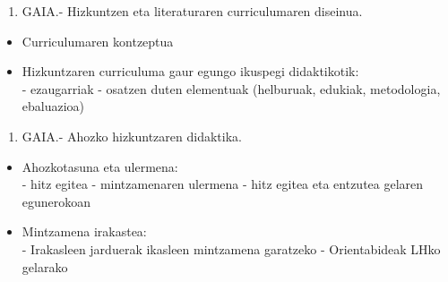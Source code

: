 \documentclass[
]{book}
\providecommand{\tightlist}{%
  \setlength{\itemsep}{0pt}\setlength{\parskip}{0pt}}
\begin{document}
\begin{enumerate}
\def\labelenumi{\arabic{enumi}.}
\tightlist
\item
  GAIA.- Hizkuntzen eta literaturaren curriculumaren diseinua.\\
\end{enumerate}

\begin{itemize}
\tightlist
\item
  Curriculumaren kontzeptua\\
\item
  Hizkuntzaren curriculuma gaur egungo ikuspegi didaktikotik:\\
  - ezaugarriak
  - osatzen duten elementuak (helburuak, edukiak, metodologia, ebaluazioa)\\
\end{itemize}

\begin{enumerate}
\def\labelenumi{\arabic{enumi}.}
\setcounter{enumi}{1}
\tightlist
\item
  GAIA.- Ahozko hizkuntzaren didaktika.\\
\end{enumerate}

\begin{itemize}
\tightlist
\item
  Ahozkotasuna eta ulermena:\\
  - hitz egitea
  - mintzamenaren ulermena
  - hitz egitea eta entzutea gelaren egunerokoan\\
\item
  Mintzamena irakastea:\\
  - Irakasleen jarduerak ikasleen mintzamena garatzeko
  - Orientabideak LHko gelarako
\end{itemize}
\end{document}
